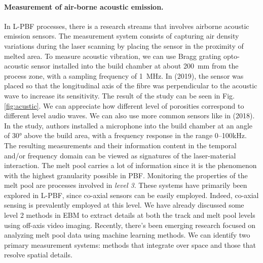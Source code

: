\paragraph{Measurement of air-borne acoustic emission.} In L-PBF processes, there is a research streams that involves airborne acoustic emission sensors. The measurement system consists of capturing air density variations during the laser scanning by placing the sensor in the proximity of melted area. To measure acoustic vibration, we can use Bragg grating opto-acoustic sensor installed into the build chamber at about \SI{200}{\milli\metre} from the process zone, with a sampling frequency of \SI{1}{\mega\hertz}. In \citeauthor{wasmer_situ_2019} (2019), the sensor was placed so that the longitudinal axis of the fibre was perpendicular to the acoustic wave to increase its sensitivity. The result of the study can be seen in Fig. \ref{fig:acustic}. We can appreciate how different level of porosities correspond to different level audio waves. We can also use more common sensors like in \citeauthor{ye_defect_2018} (2018). In the study, authors installed a microphone into the build chamber at an angle of \ang{30} above the build area, with a frequency response in the range \numrange[range-phrase=--]{0}{100}\unit{\kilo\hertz}. The resulting measurements and their information content in the temporal and/or frequency domain can be viewed as signatures of the laser-material interaction.
The melt pool carries a lot of information since it is the phenomenon with the highest granularity possible in PBF. Monitoring the properties of the melt pool are processes involved in \emph{level 3}. These systems have primarily been explored in L-PBF, since co-axial sensors can be easily employed. Indeed, co-axial sensing is prevalently employed at this level. We have already discussed some level 2 methods in EBM to extract details at both the track and melt pool levels using off-axis video imaging. Recently, there's been emerging research focused on analyzing melt pool data using machine learning methods. We can identify two primary measurement systems: methods that integrate over space and those that resolve spatial details.
